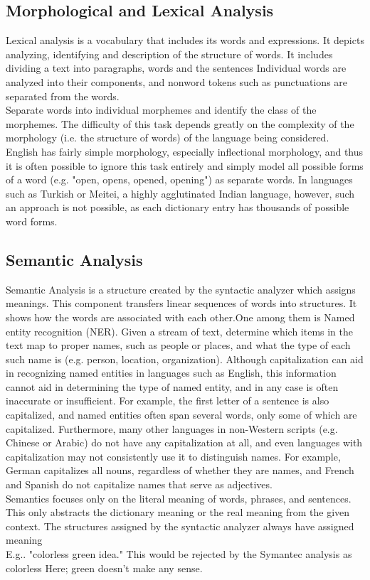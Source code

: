 \subsection{Morphological and Lexical Analysis}
Lexical analysis is a vocabulary that includes its words and expressions. It depicts analyzing, identifying and description of the structure of words. It includes dividing a text into paragraphs, words and the sentences Individual words are analyzed into their components, and nonword tokens such as punctuations are separated from the words.\\Separate words into individual morphemes and identify the class of the morphemes. The difficulty of this task depends greatly on the complexity of the morphology (i.e. the structure of words) of the language being considered. English has fairly simple morphology, especially inflectional morphology, and thus it is often possible to ignore this task entirely and simply model all possible forms of a word (e.g. "open, opens, opened, opening") as separate words. In languages such as Turkish or Meitei, a highly agglutinated Indian language, however, such an approach is not possible, as each dictionary entry has thousands of possible word forms.
\subsection{Semantic Analysis}
Semantic Analysis is a structure created by the syntactic analyzer which assigns meanings. This component transfers linear sequences of words into structures. It shows how the words are associated with each other.One among them is Named entity recognition (NER). Given a stream of text, determine which items in the text map to proper names, such as people or places, and what the type of each such name is (e.g. person, location, organization). Although capitalization can aid in recognizing named entities in languages such as English, this information cannot aid in determining the type of named entity, and in any case is often inaccurate or insufficient. For example, the first letter of a sentence is also capitalized, and named entities often span several words, only some of which are capitalized. Furthermore, many other languages in non-Western scripts (e.g. Chinese or Arabic) do not have any capitalization at all, and even languages with capitalization may not consistently use it to distinguish names. For example, German capitalizes all nouns, regardless of whether they are names, and French and Spanish do not capitalize names that serve as adjectives.\\Semantics focuses only on the literal meaning of words, phrases, and sentences. This only abstracts the dictionary meaning or the real meaning from the given context. The structures assigned by the syntactic analyzer always have assigned meaning\\E.g.. "colorless green idea." This would be rejected by the Symantec analysis as colorless Here; green doesn't make any sense.
